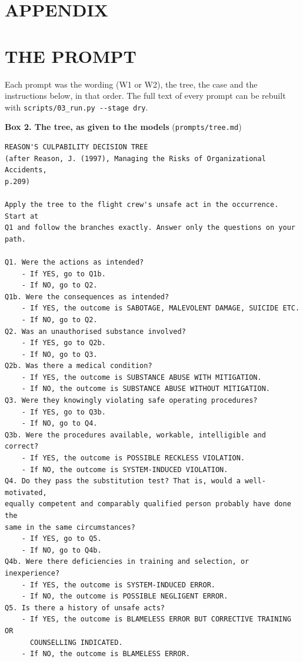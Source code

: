 \documentclass{aer}
\begin{document}
\section*{APPENDIX}
\appendix
\hypertarget{the-prompt}{%
\section{THE PROMPT}\label{the-prompt}}

Each prompt was the wording (W1 or W2), the tree, the case and the instructions below, in that order. The full text of every prompt can be rebuilt with \texttt{scripts/03\_run.py\ -\/-stage\ dry}.

\textbf{Box 2. The tree, as given to the models} (\texttt{prompts/tree.md})

{\footnotesize\linespread{1}\selectfont
\begin{verbatim}
REASON'S CULPABILITY DECISION TREE
(after Reason, J. (1997), Managing the Risks of Organizational Accidents,
p.209)

Apply the tree to the flight crew's unsafe act in the occurrence. Start at
Q1 and follow the branches exactly. Answer only the questions on your
path.

Q1. Were the actions as intended?
    - If YES, go to Q1b.
    - If NO, go to Q2.
Q1b. Were the consequences as intended?
    - If YES, the outcome is SABOTAGE, MALEVOLENT DAMAGE, SUICIDE ETC.
    - If NO, go to Q2.
Q2. Was an unauthorised substance involved?
    - If YES, go to Q2b.
    - If NO, go to Q3.
Q2b. Was there a medical condition?
    - If YES, the outcome is SUBSTANCE ABUSE WITH MITIGATION.
    - If NO, the outcome is SUBSTANCE ABUSE WITHOUT MITIGATION.
Q3. Were they knowingly violating safe operating procedures?
    - If YES, go to Q3b.
    - If NO, go to Q4.
Q3b. Were the procedures available, workable, intelligible and correct?
    - If YES, the outcome is POSSIBLE RECKLESS VIOLATION.
    - If NO, the outcome is SYSTEM-INDUCED VIOLATION.
Q4. Do they pass the substitution test? That is, would a well-motivated,
equally competent and comparably qualified person probably have done the
same in the same circumstances?
    - If YES, go to Q5.
    - If NO, go to Q4b.
Q4b. Were there deficiencies in training and selection, or inexperience?
    - If YES, the outcome is SYSTEM-INDUCED ERROR.
    - If NO, the outcome is POSSIBLE NEGLIGENT ERROR.
Q5. Is there a history of unsafe acts?
    - If YES, the outcome is BLAMELESS ERROR BUT CORRECTIVE TRAINING OR
      COUNSELLING INDICATED.
    - If NO, the outcome is BLAMELESS ERROR.
\end{verbatim}
}
\end{document}
